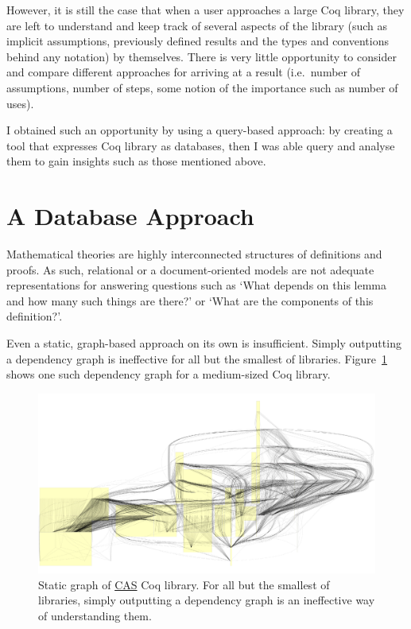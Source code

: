 However, it is still the case that when a user approaches a large Coq library, 
they are left to understand and keep track of several aspects of the
library (such as implicit assumptions, previously defined results and the
types and conventions behind any notation) by themselves. There is very little
opportunity to consider and compare different approaches for arriving at a
result (i.e.\ number of assumptions, number of steps, some notion of the
importance such as number of uses).

I obtained such an opportunity by using a query-based approach: by creating a
tool that expresses Coq library as databases, then I was able query and analyse
them to gain insights such as those mentioned above.

\section{A Database Approach}

Mathematical theories are highly interconnected structures of definitions and
proofs. As such, relational or a document-oriented models are not adequate
representations for answering questions such as `What depends on this lemma
and how many such things are there?' or `What are the components of this
definition?'.

Even a static, graph-based approach on its own is insufficient. Simply
outputting a dependency graph is ineffective for all but the smallest of
libraries. Figure~\ref{fig:static} shows one such dependency graph for a
medium-sized Coq library.

\begin{figure}[tp]

  \centering
  \includegraphics[width=\textwidth, page=1]{img/static-CAS-small.pdf}
  \caption{Static graph of
    \href{https://github.com/Timothy-G-Griffin/CAS}{CAS} Coq library. For all
    but the smallest of libraries, simply outputting a dependency graph is an
    ineffective way of understanding them.}\label{fig:static}

\end{figure}

